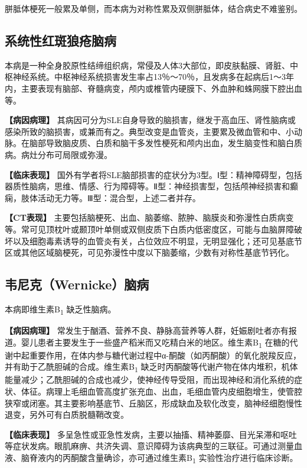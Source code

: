胼胝体梗死一般累及单侧，而本病为对称性累及双侧胼胝体，结合病史不难鉴别。

\subsection{系统性红斑狼疮脑病}

本病是一种全身胶原性结缔组织病，常侵及人体3大部位，即皮肤黏膜、肾脏、中枢神经系统。中枢神经系统损害发生率占13％～70％，且发病多在起病后1～3年内，主要表现有脑部、脊髓病变，颅内或椎管内硬膜下、外血肿和蛛网膜下腔出血等。

\textbf{【病因病理】}
其病因可分为SLE自身导致的脑损害，继发于高血压、肾性脑病或感染所致的脑损害，或兼而有之。典型改变是血管炎，主要累及微血管和中、小动脉。在脑部导致脑皮质、白质和脑干多发性梗死和颅内出血，发生脑变性和脑白质病。病灶分布可局限或弥漫。

\textbf{【临床表现】}
国外有学者将SLE脑部损害的症状分为3型。Ⅰ型：精神障碍型，包括器质性脑病，思维、情感、行为障碍等。Ⅱ型：神经损害型，包括颅神经损害和癫痫，肢体活动无力等。Ⅲ型：混合型，上述二者并存。

\textbf{【CT表现】}
主要包括脑梗死、出血、脑萎缩、脓肿、脑膜炎和弥漫性白质病变等。常可见顶枕叶或颞顶叶单侧或双侧皮质下白质内低密度区，可能与血脑屏障破坏以及细胞毒素诱导的血管炎有关，占位效应不明显，无明显强化；还可见基底节区或其他区域脑梗死，可见弥漫性中度以下脑萎缩，少数有对称性基底节钙化。

\subsection{韦尼克（Wernicke）脑病}

本病即维生素B\textsubscript{1} 缺乏性脑病。

\textbf{【病因病理】}
常发生于酗酒、营养不良、静脉高营养等人群，妊娠剧吐者亦有报道。婴儿患者主要发生于一些盛产稻米而又吃精白米的地区。维生素B\textsubscript{1}
在糖的代谢中起重要作用，在体内参与糖代谢过程中α-酮酸（如丙酮酸）的氧化脱羧反应，并有助于乙酰胆碱的合成。维生素B\textsubscript{1}
缺乏时丙酮酸等代谢产物在体内堆积，机体能量减少；乙酰胆碱的合成也减少，使神经传导受阻，而出现神经和消化系统的症状、体征。病理上毛细血管高度扩张充血、出血，毛细血管内皮细胞增生，使管腔狭窄或闭塞。其主要影响基底节、丘脑区，形成缺血及软化改变，脑神经细胞慢性退变，另外可有白质脱髓鞘改变。

\textbf{【临床表现】}
多呈急性或亚急性发病，主要以抽搐、精神萎靡、目光呆滞和呕吐等症状发病。眼肌麻痹、共济失调、意识障碍为该病典型的三联征。可通过测量血液、脑脊液内的丙酮酸含量确诊，亦可通过维生素B\textsubscript{1}
实验性治疗进行临床诊断。

